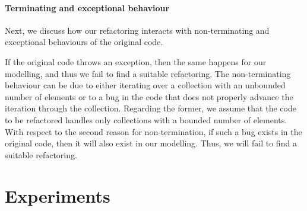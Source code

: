 \documentclass[runningheads,a4paper]{llncs}
\begin{document}



\paragraph{Terminating and exceptional behaviour}
%
Next, we discuss how our refactoring interacts with non-terminating and exceptional 
behaviours of the original code.

%
If the original code throws an exception, then the same happens for our
modelling, and thus we fail to find a suitable refactoring.
%
The non-terminating behaviour can be due to either iterating over a collection 
with an unbounded number of elements or to a bug in the code that does not properly 
advance the iteration through the collection. 
Regarding the former, we assume that the code to be refactored handles only collections with a 
bounded number of elements. %
With respect to the second reason for non-termination, if such a bug exists in the 
original code, then it will also exist in our modelling. Thus, 
we will fail to find a suitable refactoring.

\section{Experiments}
\end{document}
